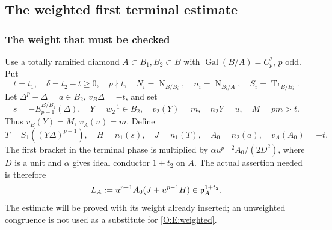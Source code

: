 \documentclass[11pt]{amsart}
\theoremstyle{definition}
\theoremstyle{remark}
\newcommand{\Tr}{\operatorname{Tr}}
\newcommand{\Nm}{\operatorname{N}}
\begin{document}
\subsection{The weighted first terminal estimate}\label{O:sec:weighted}
\subsubsection*{The weight that must be checked}
Use a totally ramified diamond $A\subset B_1,B_2\subset B$ with
$\operatorname{Gal}(B/A)=C_p^2$, $p$ odd. Put
\[
 t=t_1,\quad\delta=t_2-t\ge0,\quad p\nmid t,\quad
 N_i=\Nm_{B/B_i},\quad n_i=\Nm_{B_i/A},\quad S_i=\Tr_{B/B_i}.
\]
Let $\Delta^p-\Delta=a\in B_2$, $v_B\Delta=-t$, and set
\[
 s=-E_{p-1}^{B/B_1}(\Delta),\quad
 Y=w_2^{-1}\in B_2,\quad v_2(Y)=m,\quad n_2Y=u,\quad
 M=pm>t.
\]
Thus $v_B(Y)=M$, $v_A(u)=m$. Define
\[
 T=S_1((Y\Delta)^{p-1}),\quad H=n_1(s),\quad J=n_1(T),
 \quad A_0=n_2(a),\quad v_A(A_0)=-t.
\]
The first bracket in the terminal phase is multiplied by
$\alpha u^{p-2}A_0/(2D^2)$, where $D$ is a unit and
$\alpha$ gives ideal conductor $1+t_2$ on $A$.
The actual assertion needed is therefore
\begin{equation}\label{O:E:weighted}
 L_A:=u^{p-1}A_0(J+u^{p-1}H)\in\mathfrak p_A^{1+t_2}.
\end{equation}
The estimate will be proved with its weight already inserted; an
unweighted congruence is not used as a substitute for \eqref{O:E:weighted}.
\end{document}
